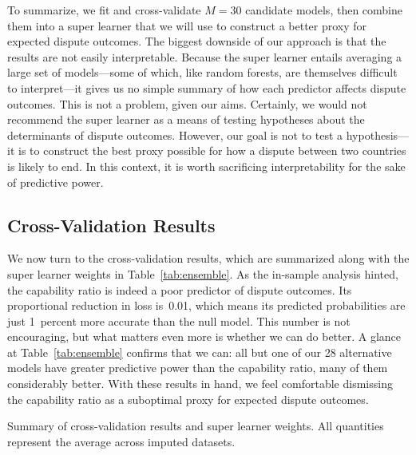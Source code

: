 To summarize, we fit and cross-validate $M = 30$ candidate models, then combine them into a super learner that we will use to construct a better proxy for expected dispute outcomes.
The biggest downside of our approach is that the results are not easily interpretable.
Because the super learner entails averaging a large set of models---some of which, like random forests, are themselves difficult to interpret---it gives us no simple summary of how each predictor affects dispute outcomes.
This is not a problem, given our aims.
Certainly, we would not recommend the super learner as a means of testing hypotheses about the determinants of dispute outcomes.
However, our goal is not to test a hypothesis---it is to construct the best proxy possible for how a dispute between two countries is likely to end.
In this context, it is worth sacrificing interpretability for the sake of predictive power.

\subsection{Cross-Validation Results}

We now turn to the cross-validation results, which are summarized along with the super learner weights in Table~\ref{tab:ensemble}.
As the in-sample analysis hinted, the capability ratio is indeed a poor predictor of dispute outcomes.
Its proportional reduction in loss is~0.01, which means its predicted probabilities are just 1~percent more accurate than the null model.
This number is not encouraging, but what matters even more is whether we can do better.
A glance at Table~\ref{tab:ensemble} confirms that we can: all but one of our 28 alternative models have greater predictive power than the capability ratio, many of them considerably better.
With these results in hand, we feel comfortable dismissing the capability ratio as a suboptimal proxy for expected dispute outcomes.

\begin{table}[tp]
  \centering
  
  \caption{
    Summary of cross-validation results and super learner weights.
    All quantities represent the average across imputed datasets.
  }
  \label{tab:ensemble}
\end{table}

